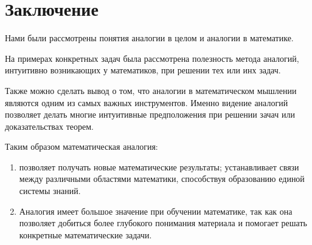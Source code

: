 \section{Заключение}

Нами были рассмотрены понятия аналогии в целом и аналогии в математике.

На примерах конкретных задач была рассмотрена полезность метода аналогий,
интуитивно возникающих у математиков, при решении тех или инх задач.

Также можно сделать вывод о том, что аналогии в математическом мышлении
являются одним из самых важных инструментов. Именно видение аналогий позволяет
делать многие интуитивные предположения при решении зачач или доказательствах
теорем.

Таким образом математическая аналогия:

\begin{enumerate}
  \item позволяет получать новые математические результаты; устанавливает связи
    между различными областями математики, способствуя образованию единой
    системы знаний.

  \item Аналогия имеет большое значение при обучении математике, так как она
    позволяет добиться более глубокого понимания материала и помогает решать
    конкретные математические задачи.
\end{enumerate}
